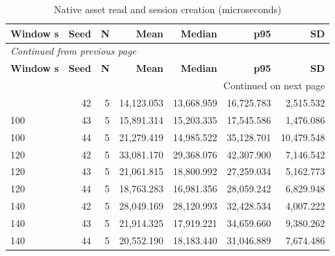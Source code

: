 \documentclass[10pt,a4paper]{article}
\begin{document}
\begin{longtable}{@{}lrrrrrr@{}}
\caption{Native asset read and session creation (microseconds)}\\
\toprule
\textbf{Window s} & \textbf{Seed} & \textbf{N} & \textbf{Mean} & \textbf{Median} & \textbf{p95} & \textbf{SD} \\
\midrule\endfirsthead
\multicolumn{7}{l}{\small\itshape Continued from previous page}\\
\toprule
\textbf{Window s} & \textbf{Seed} & \textbf{N} & \textbf{Mean} & \textbf{Median} & \textbf{p95} & \textbf{SD} \\
\midrule\endhead
\midrule\multicolumn{7}{r}{\small Continued on next page}\\\endfoot
\bottomrule\endlastfoot
100 & 42 & 5 & 14,123.053 & 13,668.959 & 16,725.783 & 2,515.532 \\
100 & 43 & 5 & 15,891.314 & 15,203.335 & 17,545.586 & 1,476.086 \\
100 & 44 & 5 & 21,279.419 & 14,985.522 & 35,128.701 & 10,479.548 \\
120 & 42 & 5 & 33,081.170 & 29,368.076 & 42,307.900 & 7,146.542 \\
120 & 43 & 5 & 21,061.815 & 18,800.992 & 27,259.034 & 5,162.773 \\
120 & 44 & 5 & 18,763.283 & 16,981.356 & 28,059.242 & 6,829.948 \\
140 & 42 & 5 & 28,049.169 & 28,120.993 & 32,428.534 & 4,007.222 \\
140 & 43 & 5 & 21,914.325 & 17,919.221 & 34,659.660 & 9,380.262 \\
140 & 44 & 5 & 20,552.190 & 18,183.440 & 31,046.889 & 7,674.486 \\
\end{longtable}\endgroup
\begingroup\small\setlength{\tabcolsep}{4pt}\renewcommand{\arraystretch}{1.12}
\end{document}
